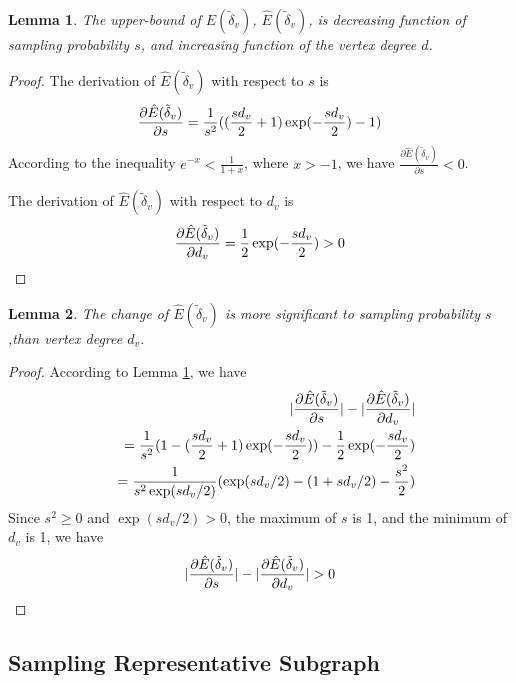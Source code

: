 \documentclass{sig-alternate-2013}
\begin{document}
\newtheorem{lemma}{Lemma}
\begin{lemma}\label{lemma-partitioning-error-func-property}
The upper-bound of $E(\tilde\delta_v)$, $\hat{E}(\tilde\delta_v)$,  is decreasing function of sampling probability $s$, and increasing function of the vertex degree $d$.
\end{lemma}
\begin{proof}
The derivation of $\hat{E}(\tilde\delta_v)$ with respect to $s$ is
\begin{eqnarray}
\frac{\partial \hat{E}(\tilde\delta_v)}{\partial s} = \frac{1}{s^2}((\frac{sd_v}{2} + 1)\exp(-\frac{sd_v}{2})-1) \notag
\end{eqnarray}
According to the inequality $e^{-x} < \frac{1}{1+x}$, where $x>-1$, we have $\frac{\partial \hat{E}(\tilde\delta_v) }{\partial s} < 0$.

The derivation of $\hat{E}(\tilde\delta_v)$ with respect to $d_v$ is
\begin{eqnarray}
\frac{\partial \hat{E}(\tilde\delta_v) }{\partial d_v} = \frac{1}{2}\exp(-\frac{sd_v}{2}) > 0 \notag
\end{eqnarray}
\end{proof}


\begin{lemma}\label{lemma-expection-error-significant}
The change of $\hat{E}(\tilde\delta_v)$ is more significant to sampling probability $s$,than vertex degree $d_v$.
\end{lemma}
\begin{proof}
According to Lemma \ref{lemma-partitioning-error-func-property}, we have
\begin{eqnarray}
&&|\frac{\partial \hat{E}(\tilde\delta_v) }{\partial s}| - |\frac{\partial \hat{E}(\tilde\delta_v)}{\partial d_v}| \notag \\
&&=\frac{1}{s^2}(1-(\frac{sd_v}{2} + 1)\exp(-\frac{sd_v}{2})) - \frac{1}{2}\exp(-\frac{sd_v}{2}) \notag \\
&&=\frac{1}{s^2 \exp(sd_v/2)}(\exp(sd_v/2)-(1+sd_v/2)-\frac{s^2}{2})  \notag \end{eqnarray}
Since $s^2 \geq 0$ and $\exp(sd_v/2) > 0$, the maximum of $s$ is 1, and the minimum of $d_v$ is 1, we have
\begin{eqnarray}
|\frac{\partial \hat{E}(\tilde\delta_v)}{\partial s}| - |\frac{\partial \hat{E}(\tilde\delta_v) }{\partial d_v}| > 0 \notag
\end{eqnarray}
\end{proof}

\subsection{Sampling Representative Subgraph }
\end{document}
